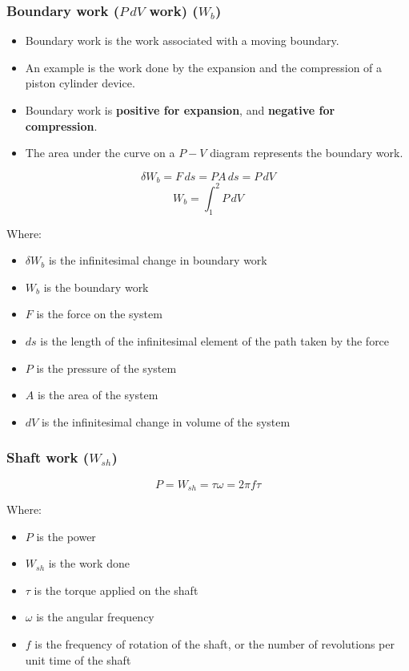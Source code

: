 \documentclass[11pt]{article}
\begin{document}
\newpage

\subsubsection{Boundary work (\(P \, dV\) work) (\(W_b\))}
\label{sec:org382c397}
\begin{itemize}
\item Boundary work is the work associated with a moving boundary.
\item An example is the work done by the expansion and the compression of a piston cylinder device.
\item Boundary work is \textbf{positive for expansion}, and \textbf{negative for compression}.
\item The area under the curve on a \(P - V\) diagram represents the boundary work.
\end{itemize}

\[\delta W_b = F \, ds = PA \, ds = P \, dV\]
\[W_b = \int_1^2 P \, dV\]

Where:
\begin{itemize}
\item \(\delta W_b\) is the infinitesimal change in boundary work
\item \(W_b\) is the boundary work
\item \(F\) is the force on the system
\item \(ds\) is the length of the infinitesimal element of the path taken by the force
\item \(P\) is the pressure of the system
\item \(A\) is the area of the system
\item \(dV\) is the infinitesimal change in volume of the system
\end{itemize}

\newpage

\subsubsection{Shaft work (\(W_{sh}\))}
\label{sec:org7ef635b}
\[P = W_{sh} = \tau \omega = 2 \pi f \tau\]

Where:
\begin{itemize}
\item \(P\) is the power
\item \(W_{sh}\) is the work done
\item \(\tau\) is the torque applied on the shaft
\item \(\omega\) is the angular frequency
\item \(f\) is the frequency of rotation of the shaft, or the number of revolutions per unit time of the shaft
\end{itemize}
\end{document}
